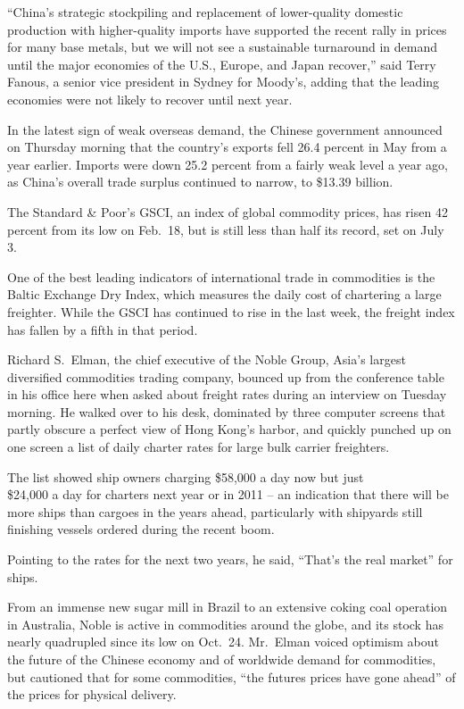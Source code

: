 ﻿\documentclass[12pt,a4paper,onecolumn]{article}
\begin{document}
``China's strategic stockpiling and replacement of lower-quality domestic production with
higher-quality imports have supported the recent rally in prices for many base metals, but we will
not see a sustainable turnaround in demand until the major economies of the U.S., Europe, and Japan
recover,'' said Terry Fanous, a senior vice president in Sydney for Moody's, adding that the leading
economies were not likely to recover until next year.

In the latest sign of weak overseas demand, the Chinese government announced on Thursday morning
that the country's exports fell 26.4 percent in May from a year earlier. Imports were down 25.2
percent from a fairly weak level a year ago, as China's overall trade surplus continued to narrow,
to \$13.39 billion.

The Standard \& Poor's GSCI, an index of global commodity prices, has risen 42 percent from its low
on Feb.~18, but is still less than half its record, set on July 3.

One of the best leading indicators of international trade in commodities is the Baltic Exchange Dry
Index, which measures the daily cost of chartering a large freighter. While the GSCI has continued
to rise in the last week, the freight index has fallen by a fifth in that period.

Richard S.~Elman, the chief executive of the Noble Group, Asia's largest diversified commodities
trading company, bounced up from the conference table in his office here when asked about freight
rates during an interview on Tuesday morning. He walked over to his desk, dominated by three
computer screens that partly obscure a perfect view of Hong Kong's harbor, and quickly punched up on
one screen a list of daily charter rates for large bulk carrier freighters.

The list showed ship owners charging \$58,000 a day now but just \\\$24,000 a day for charters next
year or in 2011 -- an indication that there will be more ships than cargoes in the years ahead,
particularly with shipyards still finishing vessels ordered during the recent boom.

Pointing to the rates for the next two years, he said, ``That's the real market'' for ships.

From an immense new sugar mill in Brazil to an extensive coking coal operation in Australia, Noble
is active in commodities around the globe, and its stock has nearly quadrupled since its low on
Oct.~24. Mr.~Elman voiced optimism about the future of the Chinese economy and of worldwide demand
for commodities, but cautioned that for some commodities, ``the futures prices have gone ahead'' of
the prices for physical delivery.
\end{document}

